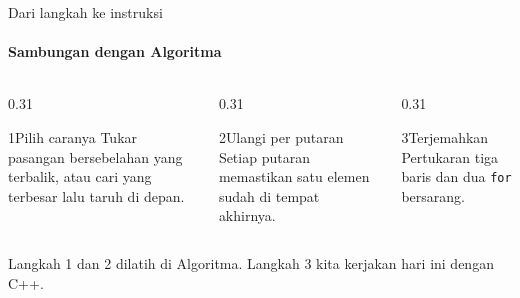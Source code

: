 \documentclass[t]{beamer}
\begin{document}
\begin{frame}{Dari langkah ke instruksi}
\framesubtitle{Sambungan dengan Algoritma}
\begin{columns}[T]
\begin{column}{0.31\textwidth}
\begin{Langkah}{1}{Pilih caranya}
Tukar pasangan bersebelahan yang terbalik, atau cari yang terbesar lalu taruh di depan.
\end{Langkah}
\end{column}
\begin{column}{0.31\textwidth}
\begin{Langkah}{2}{Ulangi per putaran}
Setiap putaran memastikan satu elemen sudah di tempat akhirnya.
\end{Langkah}
\end{column}
\begin{column}{0.31\textwidth}
\begin{Langkah}{3}{Terjemahkan}
Pertukaran tiga baris dan dua \texttt{for} bersarang.
\end{Langkah}
\end{column}
\end{columns}
\vspace{10pt}
Langkah 1 dan 2 dilatih di Algoritma. Langkah 3 kita kerjakan hari ini dengan C++.
\end{frame}

\end{document}

